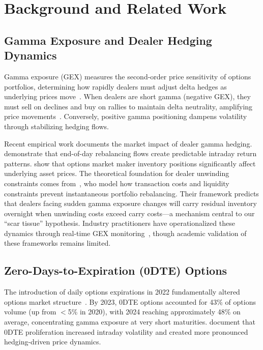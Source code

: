 \section{Background and Related Work}

\subsection{Gamma Exposure and Dealer Hedging Dynamics}

Gamma exposure (GEX) measures the second-order price sensitivity of options portfolios, determining how rapidly dealers must adjust delta hedges as underlying prices move~\citep{black1973pricing}. When dealers are short gamma (negative GEX), they must sell on declines and buy on rallies to maintain delta neutrality, amplifying price movements~\citep{ni2005stock}. Conversely, positive gamma positioning dampens volatility through stabilizing hedging flows.

Recent empirical work documents the market impact of dealer gamma hedging. \citet{baltussen2021hedging} demonstrate that end-of-day rebalancing flows create predictable intraday return patterns. \citet{gao2018market} show that options market maker inventory positions significantly affect underlying asset prices. The theoretical foundation for dealer unwinding constraints comes from~\citet{garleanu2013dynamic}, who model how transaction costs and liquidity constraints prevent instantaneous portfolio rebalancing. Their framework predicts that dealers facing sudden gamma exposure changes will carry residual inventory overnight when unwinding costs exceed carry costs---a mechanism central to our ``scar tissue'' hypothesis. Industry practitioners have operationalized these dynamics through real-time GEX monitoring~\citep{spotgamma2021,fishman2023gamma}, though academic validation of these frameworks remains limited.

\subsection{Zero-Days-to-Expiration (0DTE) Options}

The introduction of daily options expirations in 2022 fundamentally altered options market structure~\citep{cboe2024zero}. By 2023, 0DTE options accounted for 43\% of options volume (up from $<$5\% in 2020), with 2024 reaching approximately 48\% on average, concentrating gamma exposure at very short maturities. \citet{dim2025zero} document that 0DTE proliferation increased intraday volatility and created more pronounced hedging-driven price dynamics.

